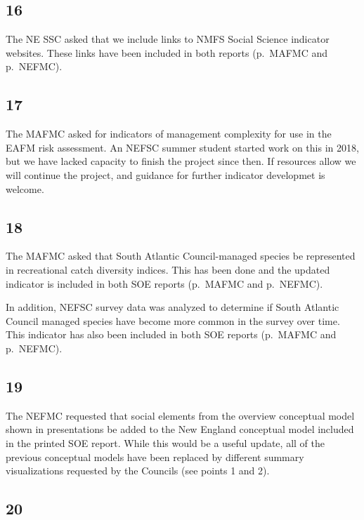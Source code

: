 \documentclass[
  10pt,
]{article}
\begin{document}
\hypertarget{section-15}{%
\subsection{16}\label{section-15}}

The NE SSC asked that we include links to NMFS Social Science indicator
websites. These links have been included in both reports (p.~MAFMC and
p.~NEFMC).

\hypertarget{section-16}{%
\subsection{17}\label{section-16}}

The MAFMC asked for indicators of management complexity for use in the
EAFM risk assessment. An NEFSC summer student started work on this in
2018, but we have lacked capacity to finish the project since then. If
resources allow we will continue the project, and guidance for further
indicator developmet is welcome.

\hypertarget{section-17}{%
\subsection{18}\label{section-17}}

The MAFMC asked that South Atlantic Council-managed species be
represented in recreational catch diversity indices. This has been done
and the updated indicator is included in both SOE reports (p.~MAFMC and
p.~NEFMC).

In addition, NEFSC survey data was analyzed to determine if South
Atlantic Council managed species have become more common in the survey
over time. This indicator has also been included in both SOE reports
(p.~MAFMC and p.~NEFMC).

\hypertarget{section-18}{%
\subsection{19}\label{section-18}}

The NEFMC requested that social elements from the overview conceptual
model shown in presentations be added to the New England conceptual
model included in the printed SOE report. While this would be a useful
update, all of the previous conceptual models have been replaced by
different summary visualizations requested by the Councils (see points 1
and 2).

\hypertarget{section-19}{%
\subsection{20}\label{section-19}}
\end{document}
